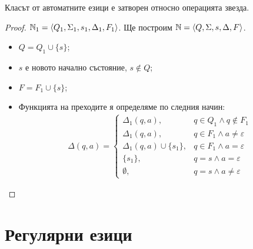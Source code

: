 \begin{lemma}
  Класът от автоматните езици е затворен относно операцията звезда.
\end{lemma}
\begin{proof}
  $\mathbb{N}_1 = \langle{Q_1,\Sigma_1,s_1,\Delta_1,F_1}\rangle$.
  Ще построим $\mathbb{N} = \langle{Q,\Sigma,s,\Delta,F}\rangle$.
  \begin{itemize}
  \item
    $Q = Q_1\cup \{s\}$;
  \item
    $s$ е новото начално състояние, $s \not\in Q$;
  \item
    $F = F_1\cup \{s\}$;
  \item
    Функцията на преходите я определяме по следния начин:
    \begin{eqnarray*}
      \Delta(q,a) = 
      \begin{cases}
        \Delta_1(q,a),            & q\in Q_1\wedge q\not\in F_1\\
        \Delta_1(q,a),            & q\in F_1\wedge a\neq \varepsilon\\
        \Delta_1(q,a)\cup\{s_1\}, & q\in F_1\wedge a = \varepsilon\\
        \{s_1\},                  & q = s\wedge a = \varepsilon\\
        \emptyset,                & q = s\wedge a\neq \varepsilon
      \end{cases}
    \end{eqnarray*}
  \end{itemize}
\end{proof}


\section{Регулярни езици}

